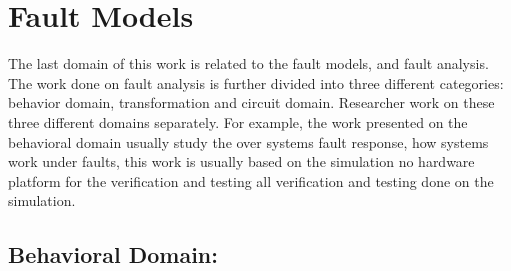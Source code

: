 


\section{Fault Models}


The last domain of this work is related to the fault models, and fault analysis. The work done on fault analysis is further divided into three different categories: behavior domain, transformation and circuit domain. Researcher work on these three different domains separately. For example, the work presented on the behavioral domain usually study the over systems fault response, how systems work under faults, this work is usually based on the simulation no hardware platform for the verification and testing all verification and testing done on the simulation.






\subsection{Behavioral Domain:}

